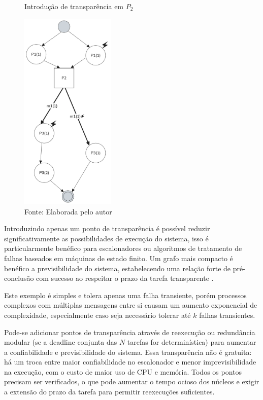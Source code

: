 \begin{figure}[H]
    \centering
    \captionsetup{justification=centering}
    \caption{Introdução de transparência em $P_2$}
    \includegraphics[width=0.40\textwidth]{assets/ftg_transparencia.png}
    \captionsetup{justification=raggedright}
    \caption*{Fonte: Elaborada pelo autor}
    \label{fig:ftgTransparencia}
\end{figure}

Introduzindo apenas um ponto de transparência é possível reduzir significativamente as possibilidades de execução do sistema, isso é particularmente benéfico para escalonadores ou algoritmos de tratamento de falhas baseados em máquinas de estado finito. Um grafo mais compacto é benéfico a previsibilidade do sistema, estabelecendo uma relação forte de pré-conclusão com sucesso ao respeitar o prazo da tarefa transparente \cite{SchedAndOptOfDistributedFT}.

Este exemplo é simples e tolera apenas uma falha transiente, porém processos complexos com múltiplas mensagens entre si causam um aumento exponencial de complexidade, especialmente caso seja necessário tolerar até $k$ falhas transientes.

Pode-se adicionar pontos de transparência através de reexecução ou redundância modular (se a deadline conjunta das $N$ tarefas for determinística) para aumentar a confiabilidade e previsibilidade do sistema. Essa transparência não é gratuita: há um troca entre maior confiabilidade no escalonador e menor imprevisibilidade na execução, com o custo de maior uso de CPU e memória. Todos os pontos precisam ser verificados, o que pode aumentar o tempo ocioso dos núcleos e exigir a extensão do prazo da tarefa para permitir reexecuções suficientes.

